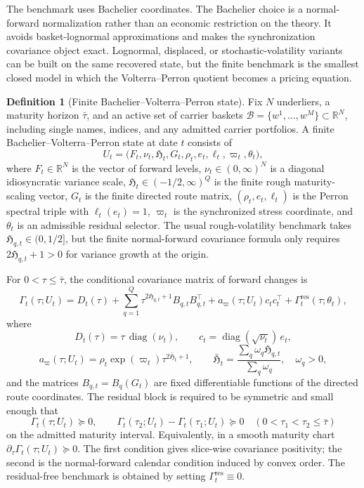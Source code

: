 \documentclass[11pt,a4paper]{amsart}
\theoremstyle{plain}
\theoremstyle{definition}
\newtheorem{definition}[theorem]{Definition}
\theoremstyle{remark}
\newcommand{\R}{\mathbb{R}}
\begin{document}
The benchmark uses Bachelier coordinates.  The Bachelier choice is a normal-forward normalization
rather than an economic restriction on the theory.  It avoids basket-lognormal approximations and makes the synchronization
covariance object exact.  Lognormal, displaced, or stochastic-volatility variants can be built on
the same recovered state, but the finite benchmark is the smallest closed model in which the
Volterra--Perron quotient becomes a pricing equation.

\begin{definition}[Finite Bachelier--Volterra--Perron state]\label{def:finite-bvp-state}
Fix \(N\) underliers, a maturity horizon \(\bar\tau\), and an active set of carrier baskets
\(\mathcal B=\{w^1,\dots,w^M\}\subset\R^N\), including single names, indices, and any admitted
carrier portfolios.  A finite Bachelier--Volterra--Perron state at date \(t\) consists of
\[
        U_t
        =
        \bigl(F_t,\nu_t,\mathfrak{H}_t,G_t,\rho_t,e_t,\ell_t,\varpi_t,\theta_t\bigr),
\]
where \(F_t\in\R^N\) is the vector of forward levels, \(\nu_t\in(0,\infty)^N\) is a diagonal
idiosyncratic variance scale, \(\mathfrak{H}_t\in(-1/2,\infty)^Q\) is the finite rough maturity-scaling
vector, \(G_t\) is the finite directed route matrix, \((\rho_t,e_t,\ell_t)\) is the Perron
spectral triple with \(\ell_t(e_t)=1\), \(\varpi_t\) is the synchronized stress coordinate, and
\(\theta_t\) is an admissible residual selector.  The usual rough-volatility benchmark takes
\(\mathfrak{H}_{q,t}\in(0,1/2]\), but the finite normal-forward covariance formula only requires
\(2\mathfrak{H}_{q,t}+1>0\) for variance growth at the origin.

For \(0<\tau\le\bar\tau\), the conditional covariance matrix of forward changes is
\[
        \Gamma_t(\tau;U_t)
        =
        D_t(\tau)
        +
        \sum_{q=1}^Q
        \tau^{2\mathfrak{H}_{q,t}+1}B_{q,t}B_{q,t}^{\top}
        +
        a_\varpi(\tau;U_t)c_tc_t^{\top}
        +
        \Gamma_t^{\mathrm{res}}(\tau;\theta_t),
\]
where
\[
        D_t(\tau)=\tau\,\operatorname{diag}(\nu_t),\qquad
        c_t=\operatorname{diag}(\sqrt{\nu_t})\,e_t,
\]
\[
        a_\varpi(\tau;U_t)=\rho_t\exp(\varpi_t)\tau^{2\bar{\mathfrak{H}}_t+1},
        \qquad
        \bar{\mathfrak{H}}_t=\frac{\sum_q \omega_q \mathfrak{H}_{q,t}}{\sum_q\omega_q},
        \quad \omega_q>0,
\]
and the matrices \(B_{q,t}=B_q(G_t)\) are fixed differentiable functions of the directed route
coordinates.  The residual block is required to be symmetric and small enough that
\[
        \Gamma_t(\tau;U_t)\succeq0,\qquad
        \Gamma_t(\tau_2;U_t)-\Gamma_t(\tau_1;U_t)\succeq0
        \quad(0<\tau_1<\tau_2\le\bar\tau)
\]
on the admitted maturity interval.  Equivalently, in a smooth maturity chart
\(\partial_\tau\Gamma_t(\tau;U_t)\succeq0\).  The first condition gives slice-wise covariance
positivity; the second is the normal-forward calendar condition induced by convex order.  The
residual-free benchmark is obtained by setting \(\Gamma_t^{\mathrm{res}}\equiv0\).
\end{definition}
\end{document}
